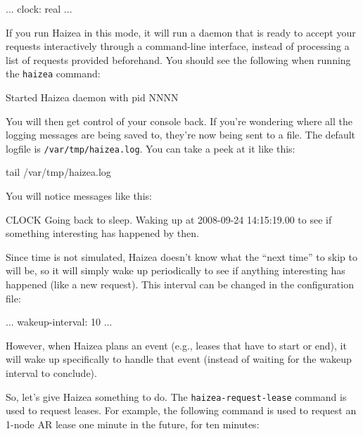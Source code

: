 \begin{wideshellverbatim}
[simulation]
...
clock: real
...
\end{wideshellverbatim}

If you run Haizea in this mode, it will run a daemon that is ready to accept your requests interactively through a command-line interface, instead of processing a list of requests provided beforehand. You should see the following when running the \texttt{haizea} command:

\begin{wideshellverbatim}
Started Haizea daemon with pid NNNN
\end{wideshellverbatim}

You will then get control of your console back. If you're wondering where all the logging messages are being saved to, they're now being sent to a file. The default logfile is \texttt{/var/tmp/haizea.log}. You can take a peek at it like this:

\begin{shellverbatim}
tail /var/tmp/haizea.log
\end{shellverbatim}

You will notice messages like this:

\begin{wideshellverbatim}
[2008-09-24 14:14:18.58] CLOCK   Going back to sleep. 
                                 Waking up at 2008-09-24 14:15:19.00 
                                 to see if something interesting has 
                                 happened by then.
\end{wideshellverbatim}

Since time is not simulated, Haizea doesn't know what the ``next time'' to skip to will be, so it will simply wake up periodically to see if anything interesting has happened (like a new request). This interval can be changed in the configuration file:

\begin{wideshellverbatim}
[simulation]
...
wakeup-interval: 10
...
\end{wideshellverbatim}

However, when Haizea plans an event (e.g., leases that have to start or end), it will wake up specifically to handle that event (instead of waiting for the wakeup interval to conclude).

So, let's give Haizea something to do. The \texttt{haizea-request-lease} command is used to request leases. For example, the following command is used to request an 1-node AR lease one minute in the future, for ten minutes:

